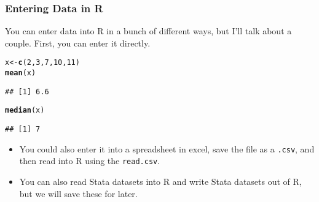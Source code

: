 \documentclass[slidestop,compress,mathserif]{beamer}\usepackage[]{graphicx}\usepackage[]{color}
\makeatletter
\newcommand{\hlnum}[1]{\textcolor[rgb]{0.686,0.059,0.569}{#1}}%
\newcommand{\hlstd}[1]{\textcolor[rgb]{0.345,0.345,0.345}{#1}}%
\newcommand{\hlkwb}[1]{\textcolor[rgb]{0.69,0.353,0.396}{#1}}%
\newcommand{\hlkwd}[1]{\textcolor[rgb]{0.737,0.353,0.396}{\textbf{#1}}}%
\newenvironment{kframe}{%
 \def\at@end@of@kframe{}%
 \ifinner\ifhmode%
  \def\at@end@of@kframe{\end{minipage}}%
  \begin{minipage}{\columnwidth}%
 \fi\fi%
 \def\FrameCommand##1{\hskip\@totalleftmargin \hskip-\fboxsep
 \colorbox{shadecolor}{##1}\hskip-\fboxsep
     \hskip-\linewidth \hskip-\@totalleftmargin \hskip\columnwidth}%
 \MakeFramed {\advance\hsize-\width
   \@totalleftmargin\z@ \linewidth\hsize
   \@setminipage}}%
 {\par\unskip\endMakeFramed%
 \at@end@of@kframe}
\newenvironment{knitrout}{}{} %
\makeatother
\begin{document}
\begin{frame}[fragile]

\frametitle{Entering Data in R}

You can enter data into R in a bunch of different ways, but I'll talk about a couple.  First, you can enter it directly. 

\begin{footnotesize}
\begin{knitrout}
\color{fgcolor}\begin{kframe}
\begin{alltt}
\hlstd{x} \hlkwb{<-} \hlkwd{c}\hlstd{(}\hlnum{2}\hlstd{,}\hlnum{3}\hlstd{,}\hlnum{7}\hlstd{,}\hlnum{10}\hlstd{,}\hlnum{11}\hlstd{)}
\hlkwd{mean}\hlstd{(x)}
\end{alltt}
\begin{verbatim}
## [1] 6.6
\end{verbatim}
\begin{alltt}
\hlkwd{median}\hlstd{(x)}
\end{alltt}
\begin{verbatim}
## [1] 7
\end{verbatim}
\end{kframe}
\end{knitrout}
\end{footnotesize}
\begin{itemize}

\item You could also enter it into a spreadsheet in excel, save the file as a \verb".csv", and then read into R using the \verb"read.csv". 

\item You can also read Stata datasets into R and write Stata datasets out of R, but we will save these for later. 

\end{itemize}

\end{frame}
\end{document}
